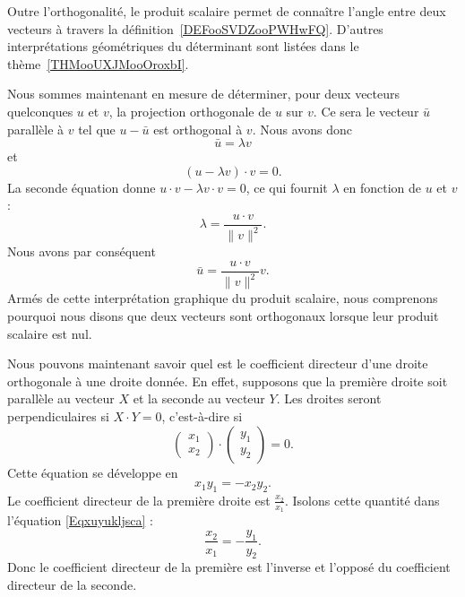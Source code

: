 \begin{remark}
	Outre l'orthogonalité, le produit scalaire permet de connaître l'angle entre deux vecteurs à travers la définition~\ref{DEFooSVDZooPWHwFQ}. D'autres interprétations géométriques du déterminant sont listées dans le thème~\ref{THMooUXJMooOroxbI}.
\end{remark}

Nous sommes maintenant en mesure de déterminer, pour deux vecteurs quelconques \( u\) et \( v\), la projection orthogonale de \( u\) sur \( v\). Ce sera le vecteur \( \bar u\) parallèle à \( v\) tel que \( u-\bar u\) est orthogonal à \( v\). Nous avons donc
\begin{equation}
	\bar u=\lambda v
\end{equation}
et
\begin{equation}
	(u-\lambda v)\cdot v=0.
\end{equation}
La seconde équation donne \( u\cdot v-\lambda v\cdot v=0\), ce qui fournit \( \lambda\) en fonction de \( u\) et \( v\) :
\begin{equation}
	\lambda=\frac{ u\cdot v }{ \| v \|^2 }.
\end{equation}
Nous avons par conséquent
\begin{equation}
	\bar u=\frac{ u\cdot v }{ \| v \|^2 }v.
\end{equation}
Armés de cette interprétation graphique du produit scalaire, nous comprenons pourquoi nous disons que deux vecteurs sont orthogonaux lorsque leur produit scalaire est nul.

Nous pouvons maintenant savoir quel est le coefficient directeur d'une droite orthogonale à une droite donnée. En effet, supposons que la première droite soit parallèle au vecteur \( X\) et la seconde au vecteur \( Y\). Les droites seront perpendiculaires si \( X\cdot Y=0\), c'est-à-dire si
\begin{equation}
	\begin{pmatrix}
		x_1 \\
		x_2
	\end{pmatrix}\cdot\begin{pmatrix}
		y_1 \\
		y_2
	\end{pmatrix}=0.
\end{equation}
Cette équation se développe en
\begin{equation}    \label{Eqxuyukljsca}
	x_1y_1=-x_2y_2.
\end{equation}
Le coefficient directeur de la première droite est \( \frac{ x_2 }{ x_1 }\). Isolons cette quantité dans l'équation \eqref{Eqxuyukljsca} :
\begin{equation}
	\frac{ x_2 }{ x_1 }=-\frac{ y_1 }{ y_2 }.
\end{equation}
Donc le coefficient directeur de la première est l'inverse et l'opposé du coefficient directeur de la seconde.

